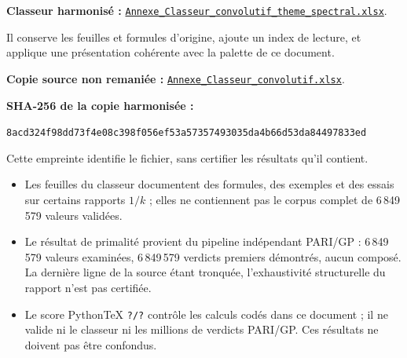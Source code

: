 \documentclass[11pt,a4paper]{article}
\newcommand{\vtotal}{?}\newcommand{\vconf}{?}\newcommand{\vtaux}{?}
\begin{document}
\medskip
\par\noindent\textbf{Classeur harmonisé :}
\href{run:assets/Annexe_Classeur_convolutif_theme_spectral.xlsx}
{\texttt{Annexe\_\allowbreak Classeur\_\allowbreak convolutif\_\allowbreak theme\_\allowbreak spectral.xlsx}}.\par
Il conserve les feuilles et formules d'origine, ajoute un index de lecture,
et applique une présentation cohérente avec la palette de ce document.
\par\noindent\textbf{Copie source non remaniée :}
\href{run:assets/Annexe_Classeur_convolutif.xlsx}
{\texttt{Annexe\_\allowbreak Classeur\_\allowbreak convolutif.xlsx}}.\par
\textbf{SHA-256 de la copie harmonisée :}
\begin{center}\small
\texttt{8acd324f98dd73f4e08c398f056ef53a57357493035da4b66d53da84497833ed}
\end{center}
Cette empreinte identifie le fichier, sans certifier les résultats qu'il contient.

\begin{boitealerte}
\begin{itemize}[nosep]
  \item Les feuilles du classeur documentent des formules, des exemples et des
    essais sur certains rapports $1/k$ ; elles ne contiennent pas le corpus
    complet de 6\,849\,579 valeurs validées.
  \item Le résultat de primalité provient du pipeline indépendant PARI/GP :
    6\,849\,579 valeurs examinées, 6\,849\,579 verdicts premiers démontrés,
    aucun composé. La dernière ligne de la source étant tronquée,
    l'exhaustivité structurelle du rapport n'est pas certifiée.
  \item Le score PythonTeX \texttt{\vconf/\vtotal} contrôle les calculs codés
    dans ce document ; il ne valide ni le classeur ni les millions de verdicts
    PARI/GP. Ces résultats ne doivent pas être confondus.
\end{itemize}
\end{boitealerte}
\end{document}
